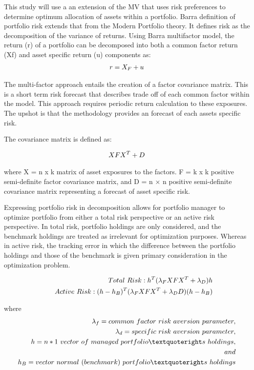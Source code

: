 \documentclass[11pt,preprint, authoryear]{elsarticle}
\numberwithin{equation}{section}
\numberwithin{figure}{section}
\numberwithin{table}{section}
\begin{document}
This study will use a an extension of the MV that uses risk preferences
to determine optimum allocation of assets within a portfolio. Barra
definition of portfolio risk extends that from the Modern Portfolio
theory. It defines risk as the decomposition of the variance of returns.
Using Barra multifactor model, the return (r) of a portfolio can be
decomposed into both a common factor return (Xf) and asset specific
return (u) components as: \begin{align} 
r= X_{F} + u \notag
\end{align}

The multi-factor approach entails the creation of a factor covariance
matrix. This is a short term risk forecast that describes trade off of
each common factor within the model. This approach requires periodic
return calculation to these exposures. The upshot is that the
methodology provides an forecast of each assets specific risk.

The covariance matrix is defined as:

\begin{align}
 XFX^T + D \label{eq1} \notag
\end{align}

where X = n x k matrix of asset exposures to the factors. F = k x k
positive semi-definite factor covariance matrix, and D = n × n positive
semi-definite covariance matrix representing a forecast of asset
specific risk.

Expressing portfolio risk in decomposition allows for portfolio manager
to optimize portfolio from either a total risk perspective or an active
risk perspective. In total risk, portfolio holdings are only considered,
and the benchmark holdings are treated as irrelevant for optimization
purposes. Whereas in active risk, the tracking error in which the
difference between the portfolio holdings and those of the benchmark is
given primary consideration in the optimization problem.

\begin{align}
Total\ Risk : h^T(\lambda_FXFX^T + \lambda_D)h \notag \\ \quad \quad 
Active \ Risk : (h-h_B)^T(\lambda_FXFX^T+\lambda_DD)(h-h_B) \notag
\end{align}

where \begin{align}
\lambda_f  =  common \ factor\ risk\ aversion\ parameter \notag,\\ \lambda_d =  specific\ risk\ aversion\ parameter \notag,\\h  =  n * 1 \ vector\ of\ managed\ portfolio’s\ holdings\notag,\\ and \notag \\h_B = vector \ normal\ (benchmark)\ portfolio’s\ holdings \notag 
\end{align}
\end{document}
